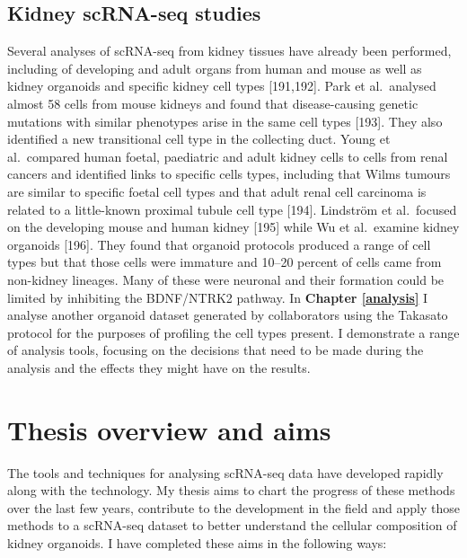\documentclass[11pt,a4paper,titlepage,twoside,openright]{style/unimelbthesis}
\theoremstyle{definition}
\theoremstyle{definition}
\theoremstyle{definition}
\theoremstyle{remark}
\begin{document}
\begin{mainmatter}
\hypertarget{kidney-scrna-seq-studies}{%
\subsection{Kidney scRNA-seq studies}\label{kidney-scrna-seq-studies}}

Several analyses of scRNA-seq from kidney tissues have already been performed, including of developing and adult organs from human and mouse as well as kidney organoids and specific kidney cell types {[}191,192{]}. Park et al.~analysed almost 58 cells from mouse kidneys and found that disease-causing genetic mutations with similar phenotypes arise in the same cell types {[}193{]}. They also identified a new transitional cell type in the collecting duct. Young et al.~compared human foetal, paediatric and adult kidney cells to cells from renal cancers and identified links to specific cells types, including that Wilms tumours are similar to specific foetal cell types and that adult renal cell carcinoma is related to a little-known proximal tubule cell type {[}194{]}. Lindström et al.~focused on the developing mouse and human kidney {[}195{]} while Wu et al.~examine kidney organoids {[}196{]}. They found that organoid protocols produced a range of cell types but that those cells were immature and 10--20 percent of cells came from non-kidney lineages. Many of these were neuronal and their formation could be limited by inhibiting the BDNF/NTRK2 pathway. In \textbf{Chapter \ref{analysis}} I analyse another organoid dataset generated by collaborators using the Takasato protocol for the purposes of profiling the cell types present. I demonstrate a range of analysis tools, focusing on the decisions that need to be made during the analysis and the effects they might have on the results.

\hypertarget{intro-overview}{%
\section{Thesis overview and aims}\label{intro-overview}}

The tools and techniques for analysing scRNA-seq data have developed rapidly along with the technology. My thesis aims to chart the progress of these methods over the last few years, contribute to the development in the field and apply those methods to a scRNA-seq dataset to better understand the cellular composition of kidney organoids. I have completed these aims in the following ways:


\end{mainmatter}
\end{document}
